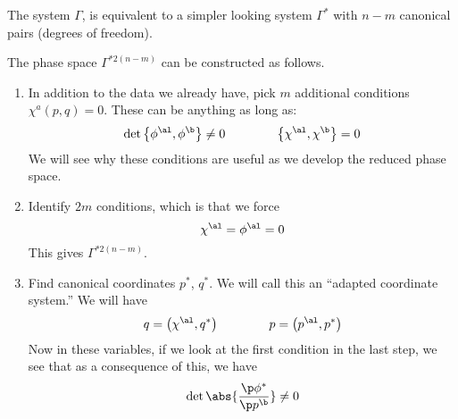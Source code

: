 \documentclass{booc}
\begin{document}
\begin{clm}
The system $\Gamma$, is equivalent to a simpler looking system $\Gamma^*$
with $n - m$ canonical pairs (degrees of freedom).
\end{clm}

The phase space  $\Gamma^{*2\left( n-m \right)}$ can be constructed as follows. 
\begin{enumerate}
\item In addition to the data we already have,
pick $m$ additional conditions $\chi^a\left( p , q \right) = 0$.
These can be anything as long as:
\begin{equation}
\det{\left\{ \phi^\al , \phi^\b \right\}} \neq 0
\qquad\qquad
\left\{ \chi^\al , \chi^\b \right\} = 0
\end{equation}
We will see why these conditions are useful as we develop the reduced phase space.
\item Identify $2m$ conditions, which is that
we force
\begin{equation}
\chi^\al = \phi^\al = 0
\label{eqn:step_two}
\end{equation}
This gives $\Gamma^{*2\left( n-m \right)}$.
\item Find canonical coordinates $p^*$, $q^*$.
We will call this an ``adapted coordinate system.''
We will have
\begin{equation}
q = \left( \chi^\al , q^* \right)
\qquad\qquad
p = \left( p^\al , p^* \right)
\end{equation}
Now in these variables, if we look at the first condition in the last step, 
we see that as a consequence of this, we have
\begin{equation}
\det{\abs{\frac{\p \phi^*}{\p p^\b}}}\neq 0
\end{equation}
\end{enumerate}
\end{document}
